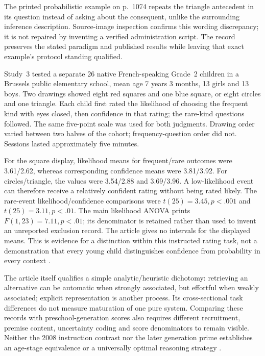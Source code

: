 The printed probabilistic example on p.~1074 repeats the triangle
antecedent in its question instead of asking about the consequent, unlike
the surrounding inference description. Source-image inspection confirms
this wording discrepancy; it is not repaired by inventing a verified
administration script. The record preserves the stated paradigm and
published results while leaving that exact example's protocol standing
qualified.

Study~3 tested a separate 26 native French-speaking Grade~2 children in
a Brussels public elementary school, mean age 7 years 3 months,
13 girls and 13 boys. Two drawings showed eight red squares and one
blue square, or eight circles and one triangle. Each child first rated
the likelihood of choosing the frequent kind with eyes closed, then
confidence in that rating; the rare-kind questions followed. The same
five-point scale was used for both judgments. Drawing order varied
between two halves of the cohort; frequency-question order did not.
Sessions lasted approximately five minutes.

For the square display, likelihood means for frequent/rare outcomes were
3.61/2.62, whereas corresponding confidence means were 3.81/3.92.
For circles/triangle, the values were 3.54/2.88 and 3.69/3.96.
A low-likelihood event can therefore receive a relatively confident
rating without being rated likely. The rare-event likelihood/confidence
comparisons were \(t(25)=3.45,p<.001\) and
\(t(25)=3.11,p<.01\). The main likelihood ANOVA prints
\(F(1,23)=7.11,p<.01\); its denominator is retained rather than
used to invent an unreported exclusion record. The article gives no
intervals for the displayed means. This is evidence for a distinction
within this instructed rating task, not a demonstration that every young
child distinguishes confidence from probability in every context
\cite[pp.~1075--1076, table~5]{MarkovitsThompson2008Development}.

The article itself qualifies a simple analytic/heuristic dichotomy:
retrieving an alternative can be automatic when strongly associated,
but effortful when weakly associated; explicit representation is another
process. Its cross-sectional task differences do not measure maturation
of one pure system. Comparing these records with preschool-generation
scores also requires different recruitment, premise content, uncertainty
coding and score denominators to remain visible. Neither the 2008
instruction contrast nor the later generation prime establishes an
age-stage equivalence or a universally optimal reasoning strategy
\cite[pp.~1076--1078]{MarkovitsThompson2008Development}.

